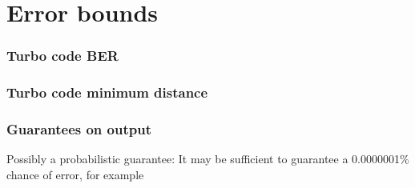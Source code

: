\chapter{Error bounds}

\subsection{Turbo code BER}

\subsection{Turbo code minimum distance}

\subsection{Guarantees on output}

Possibly a probabilistic guarantee: It may be sufficient to guarantee a 0.0000001\% chance of error, for example